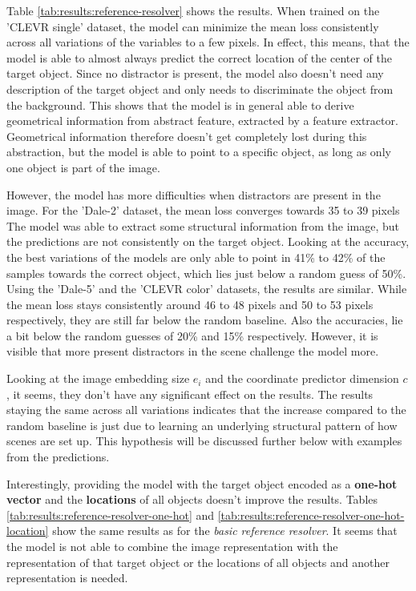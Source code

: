Table \ref{tab:results:reference-resolver} shows the results.
When trained on the 'CLEVR single' dataset, the model can minimize the mean loss consistently across all variations of the variables to a few pixels.
In effect, this means, that the model is able to almost always predict the correct location of the center of the target object.
Since no distractor is present, the model also doesn't need any description of the target object and only needs to discriminate the object from the background.
This shows that the model is in general able to derive geometrical information from abstract feature, extracted by a feature extractor.
Geometrical information therefore doesn't get completely lost during this abstraction, but the model is able to point to a specific object, as long as only one object is part of the image.

However, the model has more difficulties when distractors are present in the image.
For the 'Dale-2' dataset, the mean loss converges towards 35 to 39 pixels
The model was able to extract some structural information from the image, but the predictions are not consistently on the target object.
Looking at the accuracy, the best variations of the models are only able to point in 41\% to 42\% of the samples towards the correct object, which lies just below a random guess of 50\%.
Using the 'Dale-5' and the 'CLEVR color' datasets, the results are similar.
While the mean loss stays consistently around 46 to 48 pixels and 50 to 53 pixels respectively, they are still far below the random baseline.
Also the accuracies, lie a bit below the random guesses of 20\% and 15\% respectively.
However, it is visible that more present distractors in the scene challenge the model more.

Looking at the image embedding size $e_i$ and the coordinate predictor dimension $c$, it seems, they don't have any significant effect on the results.
The results staying the same across all variations indicates that the increase compared to the random baseline is just due to learning an underlying structural pattern of how scenes are set up.
This hypothesis will be discussed further below with examples from the predictions.

Interestingly, providing the model with the target object encoded as a \textbf{one-hot vector} and the \textbf{locations} of all objects doesn't improve the results.
Tables \ref{tab:results:reference-resolver-one-hot} and \ref{tab:results:reference-resolver-one-hot-location} show the same results as for the \emph{basic reference resolver}.
It seems that the model is not able to combine the image representation with the representation of that target object or the locations of all objects and another representation is needed.

